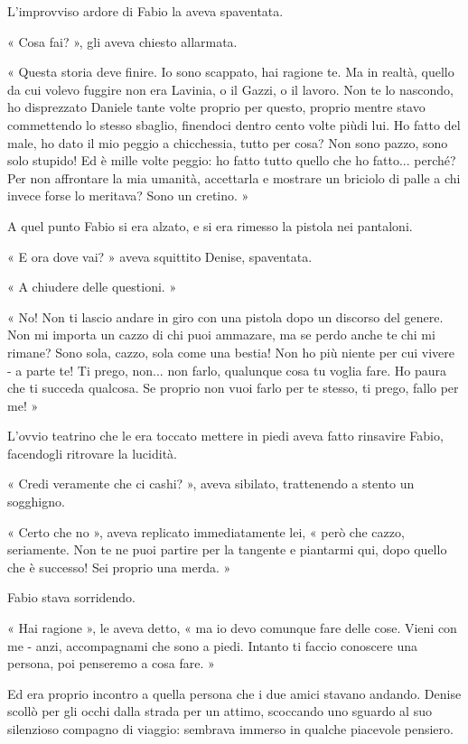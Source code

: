 L'improvviso ardore di Fabio la aveva spaventata.

« Cosa fai? », gli aveva chiesto allarmata.

« Questa storia deve finire. Io sono scappato, hai ragione te. Ma in realtà, quello da cui volevo fuggire non era Lavinia, o il Gazzi, o il lavoro. Non te lo nascondo, ho disprezzato Daniele tante volte proprio per questo, proprio mentre stavo commettendo lo stesso sbaglio, finendoci dentro cento volte piùdi lui. Ho fatto del male, ho dato il mio peggio a chicchessia, tutto per cosa? Non sono pazzo, sono solo stupido! Ed è mille volte peggio: ho fatto tutto quello che ho fatto... perché? Per non affrontare la mia umanità, accettarla e mostrare un briciolo di palle a chi invece forse lo meritava? Sono un cretino. »

A quel punto Fabio si era alzato, e si era rimesso la pistola nei pantaloni.

« E ora dove vai? » aveva squittito Denise, spaventata.

« A chiudere delle questioni. »

« No! Non ti lascio andare in giro con una pistola dopo un discorso del genere. Non mi importa un cazzo di chi puoi ammazare, ma se perdo anche te chi mi rimane? Sono sola, cazzo, sola come una bestia! Non ho più niente per cui vivere - a parte te! Ti prego, non... non farlo, qualunque cosa tu voglia fare. Ho paura che ti succeda qualcosa. Se proprio non vuoi farlo per te stesso, ti prego, fallo per me! »

L'ovvio teatrino che le era toccato mettere in piedi aveva fatto rinsavire Fabio, facendogli ritrovare la lucidità.

« Credi veramente che ci cashi? », aveva sibilato, trattenendo a stento un sogghigno.

« Certo che no », aveva replicato immediatamente lei, « però che cazzo, seriamente. Non te ne puoi partire per la tangente e piantarmi qui, dopo quello che è successo! Sei proprio una merda. »

Fabio stava sorridendo.

« Hai ragione », le aveva detto, « ma io devo comunque fare delle cose. Vieni con me - anzi, accompagnami che sono a piedi. Intanto ti faccio conoscere una persona, poi penseremo a cosa fare. »

​Ed era proprio incontro a quella persona che i due amici stavano andando. Denise scollò per gli occhi dalla strada per un attimo, scoccando uno sguardo al suo silenzioso compagno di viaggio: sembrava immerso in qualche piacevole pensiero.

